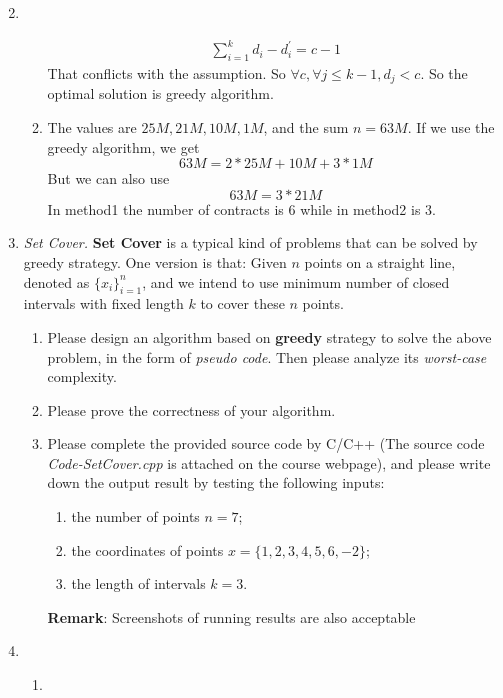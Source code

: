 \documentclass[12pt,a4paper]{article}
\makeatletter
\newtheorem*{solution}{Solution}
\theoremstyle{definition}
\renewenvironment{solution}[1][Solution] {\par\pushQED{\qed}\normalfont\topsep6\p@\@plus6\p@\relax\trivlist\item[\hskip\labelsep\bfseries#1\@addpunct{.}]\ignorespaces}{\popQED\endtrivlist\@endpefalse} \makeatother
\makeatother
\begin{document}
\begin{enumerate}
\begin{solution}
\begin{enumerate}
\begin{equation}
\begin{aligned}
                \sum_{i=1}^{k}d_i-d_{i}^{'}=c-1
                \end{aligned}
            \end{equation}
            That conflicts with the assumption. So $\forall c, \forall j\le k-1, d_j< c$.
            So the optimal solution is greedy algorithm.
            \item The values are $25M,21M,10M,1M$, and the sum $n=63M$.
            If we use the greedy algorithm, we get
            \begin{equation}
                63M=2*25M+10M+3*1M
            \end{equation}
            But we can also use
            \begin{equation}
                63M=3*21M
            \end{equation}
            In method1 the number of contracts is 6 while in method2 is 3.
        \end{enumerate}
    \end{solution}
	
    \item \textit{Set Cover.} \textbf{Set Cover} is a typical kind of problems that can be solved by greedy strategy. One version is that: Given $n$ points on a straight line, denoted as $\{x_i\}_{i=1}^n$, and we intend to use minimum number of closed intervals with fixed length $k$ to cover these $n$ points.
    \begin{enumerate}
    	\item Please design an algorithm based on \textbf{greedy} strategy to solve the above problem, in the form of \emph{pseudo code}. Then please analyze its \emph{worst-case} complexity.
    	\item Please prove the correctness of your algorithm.
    	\item Please complete the provided source code by C/C++ {\color{blue}(The source code \emph{Code-SetCover.cpp} is attached on the course webpage)}, and please write down the output result by testing the following inputs: 
    	\begin{enumerate}
    		\item the number of points $n=7$;
    		\item the coordinates of points
    		$x=\{1,2,3,4,5,6,-2\}$;
    		\item the length of intervals
    		$k=3$.
    	\end{enumerate}
        \textbf{Remark}: Screenshots of running results are also acceptable 
    \end{enumerate}
   \begin{solution}
   ~\par
   \begin{enumerate}
       \item ~\par
        \begin{algorithm}[H]
		

\end{algorithm}
\end{enumerate}
\end{solution}
\end{enumerate}
\end{document}
